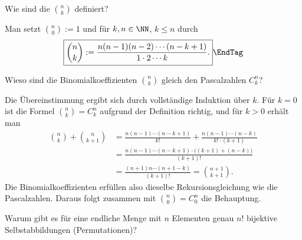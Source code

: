 \begin{frage}
  Wie sind die  $\binom{n}{k}$ definiert? 
\end{frage}

\begin{antwort}
  Man setzt $\binom{n}{0}:=1$ und für $k,n\in\NN$, $k\le n$ 
  durch 
  \[
  \boxed{
    \binom{n}{k} := \frac{n (n-1)(n-2)\cdots(n-k+1)}
    { 1\cdot 2\cdots k }.
  }
  \EndTag
  \]
\end{antwort}






\begin{frage}
  Wieso sind die Binomialkoeffizienten $\binom{n}{k}$ 
  gleich den Pascalzahlen $C_k^n$?
\end{frage}

\begin{antwort}
  Die Übereinstimmung ergibt sich durch  vollständige 
  Induktion über $k$. 
  Für $k=0$ ist die Formel $\binom{n}{k}=C^n_k$ aufgrund der 
  Definition richtig, und für $k>0$ erhält man 
  \begin{align*}
    \binom{n}{k}+\binom{n}{k+1} &=
    \frac{n(n-1)\cdots(n-k+1)}{k!}+
    \frac{n(n-1)\cdots(n-k)}{k!\cdot (k+1)} \\
    &=
    \frac{n(n-1)\cdots(n-k+1) \cdot \big( (k+1) + (n-k) \big)}{(k+1)!} \\
    &= 
    \frac{(n+1)n\cdots (n+1-k)}{(k+1)!} = 
    \binom{n+1}{k+1}.
  \end{align*}
  Die Binomialkoeffizienten erfüllen also dieselbe Rekursionsgleichung wie die 
  Pascalzahlen. Daraus folgt zusammen mit $\binom{n}{0}=C^n_0$ die Behauptung.
  \AntEnd
\end{antwort}







\begin{frage}\label{01_permutationen}
  Warum gibt es für eine endliche Menge mit $n$ Elementen genau $n!$ 
  bijektive Selbstabbildungen (Permutationen)?
\end{frage}

